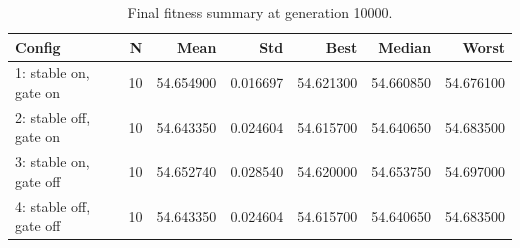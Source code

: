 \begin{table}[htbp]
\centering
\caption{Final fitness summary at generation 10000.}
\label{tab:final_fitness_summary}
\begin{tabular}{lrrrrrr}
\toprule
Config & N & Mean & Std & Best & Median & Worst \\
\midrule
1: stable on, gate on & 10 & 54.654900 & 0.016697 & 54.621300 & 54.660850 & 54.676100 \\
2: stable off, gate on & 10 & 54.643350 & 0.024604 & 54.615700 & 54.640650 & 54.683500 \\
3: stable on, gate off & 10 & 54.652740 & 0.028540 & 54.620000 & 54.653750 & 54.697000 \\
4: stable off, gate off & 10 & 54.643350 & 0.024604 & 54.615700 & 54.640650 & 54.683500 \\
\bottomrule
\end{tabular}
\end{table}

